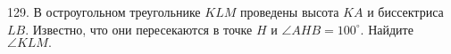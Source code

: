 129. В остроугольном треугольнике $KLM$ проведены высота $KA$ и биссектриса $LB.$ Известно, что они пересекаются в точке $H$ и $\angle AHB=100^\circ.$ Найдите $\angle KLM.$\\
